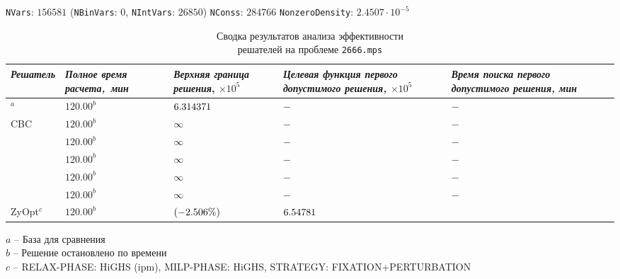 \documentclass[%
	11pt,
	a4paper,
	utf8,
		]{article}
\begin{document}
\newpage
% 
\def\nVarsQ{156581}
\def\nBinVarsQ{0}
\def\nIntVarsQ{26850}
\def\nConssQ{284766}
\def\firstSolZyoptObjQ{6.54781}  %
\def\firstSolZyoptTimeQ{ 1675.2 / 60}

\newcommand{\cplexObjQ}{6.314371}  %
\newcommand{\zyoptObjQ}{6.472611}  %
\newcommand{\zyoptGapQ}{2.97}
\newcommand{\highsObjQ}{}  %
\newcommand{\cplexZyoptObjRelQ}{(\fpeval{\cplexObjQ} - \fpeval{\zyoptObjQ}) / \fpeval{\cplexObjQ} * 100}
\newcommand{\cplexScipObjRelQ}{(\fpeval{\cplexObjQ} - \fpeval{\scipObjQ}) / \fpeval{\cplexObjQ} * 100}

{
	\begin{table}[!h]
		\centering
		\caption{Сводка результатов анализа эффективности \\решателей на проблеме \texttt{2666.mps}}
		
		{\footnotesize \texttt{NVars}: $ \nVarsQ $ (\texttt{NBinVars}: $ \nBinVarsQ $,  \texttt{NIntVars}: $ \nIntVarsQ $) \texttt{NConss}: $ \nConssQ $ \texttt{NonzeroDensity}: $ 2.4507 \cdot 10^{-5} $}\\[2mm]
		
		\begin{tabular}{ p{2.9cm} | p{2.5cm} p{3.4cm} p{3.75cm} p{3.6cm} p{3.2cm} }
			\rowcolor{black!5}\emph{Решатель} & \emph{Полное время \mbox{расчета, мин}} & \emph{Верхняя граница} \mbox{\itshape решения}, $ \times 10^{5} $ & \emph{Целевая функция первого допустимого решения, $ \times 10^5 $} & \emph{Время поиска первого допустимого решения, мин} \\
			\hline
			\rowcolor{blue!3}{CPLEX 12.8.0.0}$ ^a $ & $ 120.00^b $ & $ \fpeval{trunc(\cplexObjQ, 6)} $ & $ - $ & $ - $ \\
			\rowcolor{black!5}	{CBC} & $ 120.00^b $ & $ \infty $ & $ - $ & $ - $ \\
			\rowcolor{blue!3}{SCIP 8.0.3} & $ 120.00^b $ & $ \infty $ & $ - $ & $ - $ \\
			\rowcolor{black!5}{COPT 6.0.5} & $ 120.00^b $ & $ \infty $ & $ - $ & $ - $ \\
			\rowcolor{blue!5}{Archiplex 1.0.2.41} & $ 120.00^b $ & $ \infty $ & $ - $ & $ - $ \\
			\rowcolor{black!5}{HiGHS 1.5.3} & $ 120.00^b $ & $ \infty $ & $ - $ & $ - $ \\
			\rowcolor{blue!3}ZyOpt$^c$ & $ 120.00^b $  & \ccb{$ \fpeval{trunc(\zyoptObjQ, 6)} $} $ (\fpeval{trunc(\cplexZyoptObjRelQ, 3)}\%) $ & $ \fpeval{trunc(\firstSolZyoptObjQ, 6)} $ & \fpeval{trunc(\firstSolZyoptTimeQ, 3)} \\
		\end{tabular}
	\end{table}
	\vspace*{-3mm}
	\hspace*{5mm}$ a $ -- {\footnotesize База для сравнения}\\[-7mm]
	
	\hspace*{5mm}$ b $ -- {\footnotesize Решение остановлено по времени}\\[-7mm]
	
	\hspace*{5mm}$ c $ -- {\footnotesize RELAX-PHASE: HiGHS (ipm), MILP-PHASE: HiGHS, STRATEGY: FIXATION+PERTURBATION}\\[-7mm]
}
\end{document}
